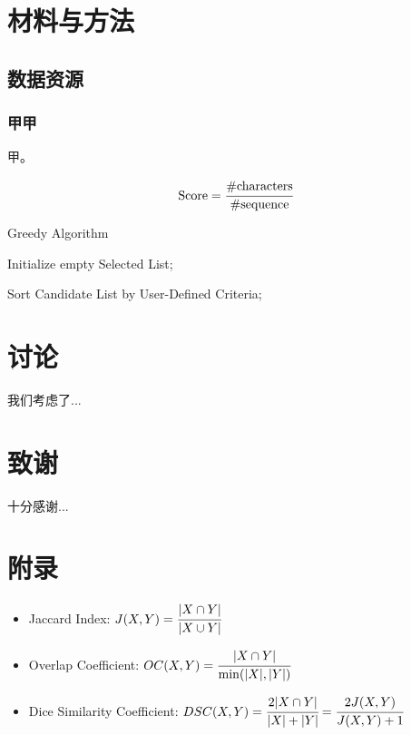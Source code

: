 \documentclass[UTF8,12pt]{ctexart}
\begin{document}
\section{材料与方法}

\subsection{数据资源}

\subsubsection{甲甲}

    甲\cite{10.10086/nar/gkd1001}。

    \begin{equation}
        \text{Score}= \cfrac{\#\text{characters}}{\#\text{sequence}}
        \label{equ:score}
    \end{equation}

    \begin{algorithm}[H]
        \caption{Greedy Algorithm}
        \BlankLine
        Initialize empty Selected List;
        
        Sort Candidate List by User-Defined Criteria;
            
    \end{algorithm}

\section{讨论}

    我们考虑了...

\newpage
{}


\newpage
\section{致谢}

    十分感谢...

\newpage
\section{附录}

    \begin{itemize}
        \item Jaccard Index: $J(X,Y)=\cfrac{| X\cap Y |}{| X\cup Y |}$
        \item Overlap Coefficient: $OC(X,Y)=\cfrac{| X\cap Y |}{\min(|X|,|Y|)}$
        \item Dice Similarity Coefficient: $DSC(X,Y)=\cfrac{2| X\cap Y |}{|X|+|Y|}=\cfrac{2J(X,Y)}{J(X,Y)+1}$
    \end{itemize}
\end{document}

